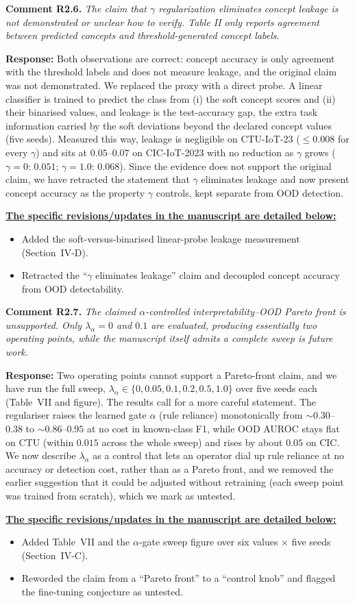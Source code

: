 \documentclass[11pt]{article}
\newcommand{\cmt}[2]{\medskip\noindent\textbf{Comment #1.} \textit{#2}\par}
\newcommand{\resp}{\smallskip\par\noindent\textbf{Response:} }
\newcommand{\revs}{\smallskip\par\noindent\underline{\textbf{The specific revisions/updates in the manuscript are detailed below:}}\par}
\begin{document}
\cmt{R2.6}{The claim that $\gamma$ regularization eliminates concept leakage is
not demonstrated or unclear how to verify. Table II only reports agreement
between predicted concepts and threshold-generated concept labels.}
\resp Both observations are correct: concept accuracy is only agreement with the
threshold labels and does not measure leakage, and the original claim was not
demonstrated. We replaced the proxy with a direct probe. A linear classifier is
trained to predict the class from (i) the soft concept scores and (ii) their
binarised values, and leakage is the test-accuracy gap, the extra task information
carried by the soft deviations beyond the declared concept values (five seeds).
Measured this way, leakage is negligible on CTU-IoT-23 ($\le0.008$ for every
$\gamma$) and sits at $0.05$--$0.07$ on CIC-IoT-2023 with no reduction as $\gamma$
grows ($\gamma{=}0$: $0.051$; $\gamma{=}1.0$: $0.068$). Since the evidence does not
support the original claim, we have retracted the statement that $\gamma$
eliminates leakage and now present concept accuracy as the property $\gamma$
controls, kept separate from OOD detection.
\revs
\begin{itemize}
  \item Added the soft-versus-binarised linear-probe leakage measurement
  (Section~IV-D).
  \item Retracted the ``$\gamma$ eliminates leakage'' claim and decoupled concept
  accuracy from OOD detectability.
\end{itemize}

\cmt{R2.7}{The claimed $\alpha$-controlled interpretability--OOD Pareto front is
unsupported. Only $\lambda_\alpha=0$ and $0.1$ are evaluated, producing
essentially two operating points, while the manuscript itself admits a complete
sweep is future work.}
\resp Two operating points cannot support a Pareto-front claim, and we have run the
full sweep, $\lambda_\alpha \in \{0,0.05,0.1,0.2,0.5,1.0\}$ over five seeds each
(Table~VII and figure). The results call for a more careful statement. The
regulariser raises the learned gate $\alpha$ (rule reliance) monotonically from
${\sim}0.30$--$0.38$ to ${\sim}0.86$--$0.95$ at no cost in known-class F1, while
OOD AUROC stays flat on CTU (within $0.015$ across the whole sweep) and rises by
about $0.05$ on CIC. We now describe $\lambda_\alpha$ as a control that lets an
operator dial up rule reliance at no accuracy or detection cost, rather than as a
Pareto front, and we removed the earlier suggestion that it could be adjusted
without retraining (each sweep point was trained from scratch), which we mark as
untested.
\revs
\begin{itemize}
  \item Added Table~VII and the $\alpha$-gate sweep figure over six values $\times$
  five seeds (Section~IV-C).
  \item Reworded the claim from a ``Pareto front'' to a ``control knob'' and
  flagged the fine-tuning conjecture as untested.
\end{itemize}
\end{document}
